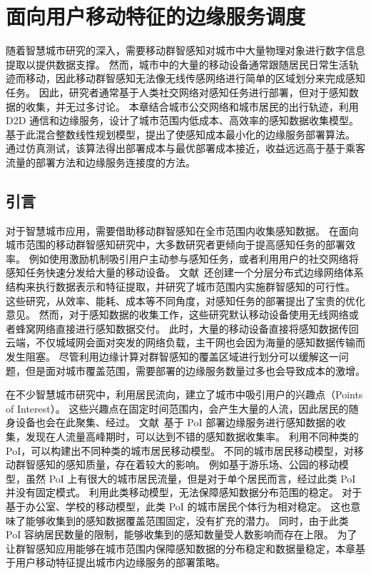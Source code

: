 \chapter{面向用户移动特征的边缘服务调度}

随着智慧城市研究的深入，需要移动群智感知对城市中大量物理对象进行数字信息提取以提供数据支撑。
然而，城市中的大量的移动设备通常跟随居民日常生活轨迹而移动，因此移动群智感知无法像无线传感网络进行简单的区域划分来完成感知任务。
因此，研究者通常基于人类社交网络对感知任务进行部署，但对于感知数据的收集，并无过多讨论。
本章结合城市公交网络和城市居民的出行轨迹，利用 D2D 通信和边缘服务，设计了城市范围内低成本、高效率的感知数据收集模型。
基于此混合整数线性规划模型，提出了使感知成本最小化的边缘服务部署算法。
通过仿真测试，该算法得出部署成本与最优部署成本接近，收益远远高于基于乘客流量的部署方法和边缘服务连接度的方法。

\section{引言}

对于智慧城市应用，需要借助移动群智感知在全市范围内收集感知数据。
在面向城市范围的移动群智感知研究中，大多数研究者更倾向于提高感知任务的部署效率。
例如使用激励机制吸引用户主动参与感知任务，或者利用用户的社交网络将感知任务快速分发给大量的移动设备。
文献~\cite{DBLP:journals/tii/TangCHPWHY17}还创建一个分层分布式边缘网络体系结构来执行数据表示和特征提取，并研究了城市范围内实施群智感知的可行性。
这些研究，从效率、能耗、成本等不同角度，对感知任务的部署提出了宝贵的优化意见。
然而，对于感知数据的收集工作，这些研究默认移动设备使用无线网络或者蜂窝网络直接进行感知数据交付。
此时，大量的移动设备直接将感知数据传回云端，不仅城域网会面对突发的网络负载，主干网也会因为海量的感知数据传输而发生阻塞。
尽管利用边缘计算对群智感知的覆盖区域进行划分可以缓解这一问题，但是面对城市覆盖范围，需要部署的边缘服务数量过多也会导致成本的激增。

在不少智慧城市研究中，利用居民流向，建立了城市中吸引用户的兴趣点（Points of Interest）。
这些兴趣点在固定时间范围内，会产生大量的人流，因此居民的随身设备也会在此聚集、经过。
文献~\cite{DBLP:journals/iotj/ZhanXZW18}基于 PoI 部署边缘服务进行感知数据的收集，发现在人流量高峰期时，可以达到不错的感知数据收集率。
利用不同种类的 PoI，可以构建出不同种类的城市居民移动模型。
不同的城市居民移动模型，对移动群智感知的感知质量，存在着较大的影响。
例如基于游乐场、公园的移动模型，虽然 PoI 上有很大的城市居民流量，但是对于单个居民而言，经过此类 PoI 并没有固定模式。
利用此类移动模型，无法保障感知数据分布范围的稳定。
对于基于办公室、学校的移动模型，此类 PoI 的城市居民个体行为相对稳定。
这也意味了能够收集到的感知数据覆盖范围固定，没有扩充的潜力。
同时，由于此类 PoI 容纳居民数量的限制，能够收集到的感知数量受人数影响而存在上限。
为了让群智感知应用能够在城市范围内保障感知数据的分布稳定和数据量稳定，本章基于用户移动特征提出城市内边缘服务的部署策略。

